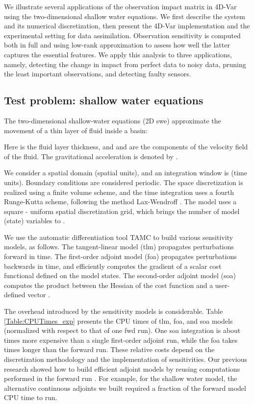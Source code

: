 \documentclass[final,sort&compress]{elsarticle}
\begin{document}
We illustrate several applications of the observation impact matrix in 4D-Var using the two-dimensional shallow water equations.
We first describe the system and its numerical discretization, then 
present the 4D-Var implementation and the experimental setting for data assimilation.
Observation sensitivity is computed both in full and using low-rank approximation to assess how well the latter captures the essential features.
We apply this analysis to three applications, namely, detecting the change in impact from perfect data to noisy data, 
pruning the least important observations, and detecting faulty sensors.


\subsection{Test problem: shallow water equations}


The two-dimensional shallow-water equations (2D {\sc swe}) \cite{CPA:CPA3160210103} approximate the movement of a thin layer of fluid inside a basin:

Here  is the fluid layer thickness, and  and  are the components of 
the velocity field of the fluid. The gravitational acceleration is denoted by . 

We consider a spatial domain  (spatial units), 
and an integration window is  (time units). 
Boundary conditions are considered periodic. The space discretization is realized using a finite volume scheme, 
and the time integration uses a fourth Runge-Kutta scheme, following the method Lax-Wendroff \cite{Wendroff_1998}.
The model uses a square - uniform spatial discretization grid, which brings the number of model (state) variables to .

We use the automatic differentiation tool TAMC \cite{giering1997tangent,TAMC_1998} 
to build various sensitivity models, as follows. 
The tangent-linear model ({\sc tlm}) propagates perturbations forward in time. 
The first-order adjoint model ({\sc foa}) propagates perturbations backwards in time, 
and efficiently computes the gradient of a scalar cost functional defined on the model states. 
The second-order adjoint model ({\sc soa}) computes the product between the Hessian of the cost function 
and a user-defined vector \cite{Cioaca_2011}. 

The overhead introduced by the sensitivity models is considerable.
Table \ref{Table:CPUTimes_exp} presents the CPU times of {\sc tlm}, {\sc foa}, and {\sc soa} models 
(normalized with respect to that of one {\sc fwd} run). 
One {\sc soa} integration is about  times more expensive than a single first-order adjoint run, 
while the {\sc foa} takes  times longer than the forward run. 
These relative costs depend on the discretization methodology and the implementation of sensitivities. 
Our previous research showed how to build efficient adjoint models by reusing computations performed
in the forward run \cite{Cioaca_2011}. For example, for the shallow water model, the alternative continuous adjoints we built required
a fraction of the forward model CPU time to run. 
\end{document}
